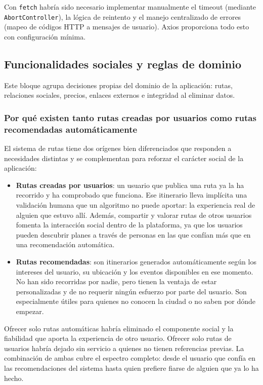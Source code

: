 Con \texttt{fetch} habría sido necesario implementar manualmente el timeout (mediante \texttt{AbortController}), la lógica de reintento y el manejo centralizado de errores (mapeo de códigos HTTP a mensajes de usuario). Axios proporciona todo esto con configuración mínima.

\subsection{Funcionalidades sociales y reglas de dominio}

Este bloque agrupa decisiones propias del dominio de la aplicación: rutas, relaciones sociales, precios, enlaces externos e integridad al eliminar datos.

\subsubsection{Por qué existen tanto rutas creadas por usuarios como rutas recomendadas automáticamente}

El sistema de rutas tiene dos orígenes bien diferenciados que responden a necesidades distintas y se complementan para reforzar el carácter social de la aplicación:

\begin{itemize}
    \item \textbf{Rutas creadas por usuarios}: un usuario que publica una ruta ya la ha recorrido y ha comprobado que funciona. Ese itinerario lleva implícita una validación humana que un algoritmo no puede aportar: la experiencia real de alguien que estuvo allí. Además, compartir y valorar rutas de otros usuarios fomenta la interacción social dentro de la plataforma, ya que los usuarios pueden descubrir planes a través de personas en las que confían más que en una recomendación automática.
    \item \textbf{Rutas recomendadas}: son itinerarios generados automáticamente según los intereses del usuario, su ubicación y los eventos disponibles en ese momento. No han sido recorridas por nadie, pero tienen la ventaja de estar personalizadas y de no requerir ningún esfuerzo por parte del usuario. Son especialmente útiles para quienes no conocen la ciudad o no saben por dónde empezar.
\end{itemize}

Ofrecer solo rutas automáticas habría eliminado el componente social y la fiabilidad que aporta la experiencia de otro usuario. Ofrecer solo rutas de usuarios habría dejado sin servicio a quienes no tienen referencias previas. La combinación de ambas cubre el espectro completo: desde el usuario que confía en las recomendaciones del sistema hasta quien prefiere fiarse de alguien que ya lo ha hecho.

